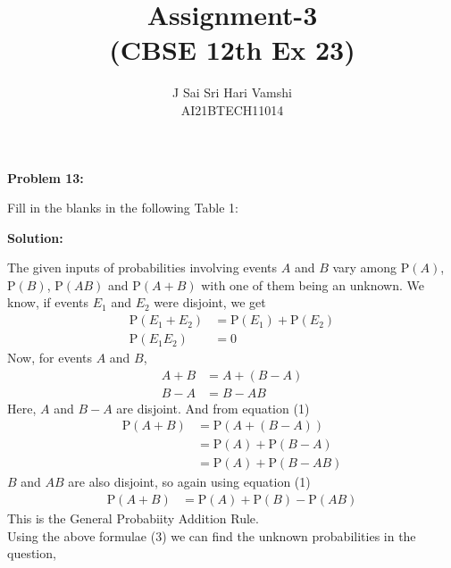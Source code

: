 \documentclass[journal,12pt,twocolumn]{article}\usepackage[margin=1.25 in]{geometry}
\title{\LARGE{\textbf{Assignment-3}\\(CBSE 12th Ex 23)}}
\author{\normalsize J Sai Sri Hari Vamshi\\ \footnotesize AI21BTECH11014}
\date{}
\providecommand{\pr}[1]{\ensuremath{\text{P}\left(#1\right)}}
\begin{document}
\maketitle
\begin{center}
    \textbf{\large Problem 13:}
\end{center}
\noindent Fill in the blanks in the following Table 1:

\begin{table}[h!]
\label{table}

\caption{}
\end{table}

\begin{center}
    \textbf{\large Solution:}
\end{center}

\noindent The given inputs of probabilities involving events $A$ and $B$ vary among $\pr A$, $\pr B$, $\pr{AB}$ and $\pr{A+B}$ with one of them being an unknown.
\noindent We know, if events $E_1$ and $E_2$ were disjoint, we get
\begin{align}
\pr{E_1 + E_2} & = \pr{E_1} + \pr{E_2} \\
\pr{E_1 E_2} & = 0
\end{align}
\noindent Now, for events $A$ and $B$,
\begin{align*}
A + B & = A + (B - A) \\
B - A & = B - AB
\end{align*}
\noindent Here, $A$ and $B - A$ are disjoint. And from equation (1)
\begin{align*}
\pr{A + B} & = \pr{A + (B - A)}\\
& = \pr A + \pr{B - A}\\
& = \pr A + \pr{B - AB}
\end{align*}
\noindent $B$ and $AB$ are also disjoint, so again using equation (1)
\begin{align}
\pr{A + B} & = \pr A + \pr B - \pr{AB}
\end{align}
\noindent This is the General Probabiity Addition Rule.\\
\noindent Using the above formulae (3) we can find the unknown probabilities in the question,
\end{document}
